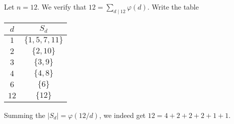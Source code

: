 \begin{example}
  Let $n = 12$. We verify that
  $12 = \sum_{d \mid 12} \varphi(d)$.
  Write the table
  \begin{center}
  \begin{tabular}{c|c}
    $d$ & $S_d$ \\
    \hline
    $1$ & $\{1, 5, 7, 11\}$ \\
    $2$ & $\{2, 10\}$ \\
    $3$ & $\{3, 9\}$ \\
    $4$ & $\{4, 8\}$ \\
    $6$ & $\{6\}$ \\
    $12$ & $\{12\}$
  \end{tabular}
  \end{center}
  Summing the $|S_d| = \varphi(12 / d)$, we
  indeed get
  $12 = 4 + 2 + 2 + 2 + 1 + 1$.
\end{example}
